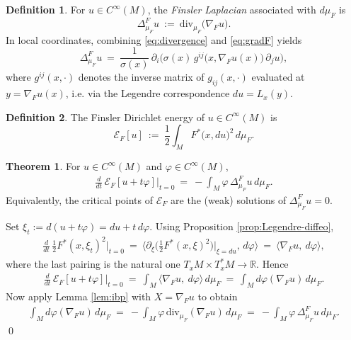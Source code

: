 \documentclass[fleqn,11pt,twoside]{article}
\makeatletter
\renewenvironment{proof}[1][\proofname]{\par
  \normalfont
  \topsep6\p@\@plus6\p@ \trivlist
  \item[\hskip\labelsep\textbf{%
    #1\@addpunct{.}}]\ignorespaces
}{%
  \qed\endtrivlist
}
\theoremstyle{definition}
\newtheorem*{definition}{Definition}
\newtheorem{theorem}{Theorem}
\makeatother
\begin{document}
\begin{definition}\label{def:laplacian}
For $u\in C^\infty(M)$, the \emph{Finsler Laplacian} associated with $d\mu_F$ is
\begin{equation}\label{eq:laplacian}
\Delta^F_{\mu_F} u\ :=\ \mathrm{div}_{\mu_F}\big(\nabla_F u\big).
\end{equation}
In local coordinates, combining \eqref{eq:divergence} and \eqref{eq:gradF} yields
\begin{equation}\label{eq:laplacian-local}
   \Delta^F_{\mu_F} u\ =\ \frac{1}{\sigma(x)}\,
   \partial_i\!\Big(\sigma(x)\, g^{ij}\!\big(x,\nabla_F u(x)\big)\,\partial_j u\Big),
\end{equation}
where $g^{ij}(x,\cdot)$ denotes the inverse matrix of $g_{ij}(x,\cdot)$ evaluated at $y=\nabla_F u(x)$,
i.e. via the Legendre correspondence $du=L_x(y)$.
\end{definition}

\begin{definition}\label{def:dirichlet}
The Finsler Dirichlet energy of $u\in C^\infty(M)$ is
\begin{equation}\label{eq:dirichlet-energy}
\mathcal{E}_F[u]\ :=\ \frac 12\int_M F^*\!\big(x,du\big)^2\, d\mu_F.
\end{equation}
\end{definition}

\begin{theorem}\label{thm:EL-Dirichlet}
For $u\in C^\infty(M)$ and $\varphi\in C^\infty(M)$,
\begin{align*}
\frac{d}{dt}\,\mathcal{E}_F[u+t\varphi]\Big|_{t=0}
\ =\ -\int_M \varphi\, \Delta^F_{\mu_F}u\, d\mu_F.
\end{align*}
Equivalently, the critical points of $\mathcal{E}_F$ are the (weak) solutions of
$\Delta^F_{\mu_F} u=0$.
\end{theorem}

\begin{proof}
Set $\xi_t:=d(u+t\varphi)=du+t\,d\varphi$. Using Proposition \ref{prop:Legendre-diffeo},
\begin{align*}
\frac{d}{dt}\,\frac 12 F^*(x,\xi_t)^2\Big|_{t=0}
\ =\ \Big\langle \partial_\xi\!\Big(\tfrac 12 F^*(x,\xi)^2\Big)\Big|_{\xi=du}\!,\, d\varphi\Big\rangle
\ =\ \langle \nabla_F u,\ d\varphi\rangle,
\end{align*}
where the last pairing is the natural one $T_xM\times T_x^*M\to\mathbb{R}$. Hence
\begin{align*}
\frac{d}{dt}\,\mathcal{E}_F[u+t\varphi]\Big|_{t=0}
\ =\ \int_M \! \langle \nabla_F u,\ d\varphi\rangle\, d\mu_F
\ =\ \int_M \! d\varphi(\nabla_F u)\, d\mu_F.
\end{align*}
Now apply Lemma \ref{lem:ibp} with $X=\nabla_F u$ to obtain
\begin{align*}
\int_M d\varphi(\nabla_F u)\, d\mu_F
\ =\ -\int_M \varphi\, \mathrm{div}_{\mu_F}(\nabla_F u)\, d\mu_F
\ =\ -\int_M \varphi\, \Delta^F_{\mu_F}u\, d\mu_F.
\end{align*}
\end{proof}
\end{document}
